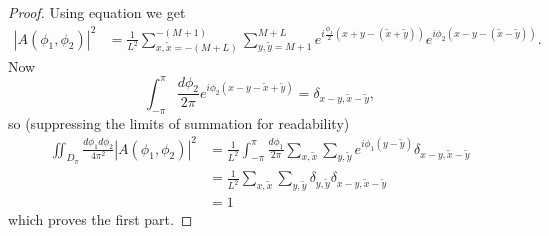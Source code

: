\documentclass[../thesis-main/thesis-main]{subfiles}
\begin{document}
\begin{proof}
Using equation  we get
\begin{align*}
|A(\phi_{1},\phi_{2})|^{2} & =  \frac{1}{L^{2}} \sum_{x,\tilde{x}=-(M+L)}
  ^{-(M+1)} \sum_{y,\tilde{y}=M+1}^{M+L}
	e^{i\frac{\phi_{1}}{2}\left(x+y-(\tilde{x}+\tilde{y})\right)}
        e^{i\phi_{2}\left(x-y-(\tilde{x}-\tilde{y})\right)}.
\end{align*}
Now 
\[
\int_{-\pi}^{\pi}\frac{d\phi_{2}}{2\pi}e^{i\phi_{2}
  \left(x-y-\tilde{x}+\tilde{y}\right)}=\delta_{x-y,\tilde{x}-\tilde{y}},
\]
so (suppressing the limits of summation for readability) 
\begin{align*}
\iint_{D_{\pi}}\frac{d\phi_{1}d\phi_{2}}{4\pi^{2}}
   |A(\phi_{1},\phi_{2})|^{2} 
   & =  \frac{1}{L^{2}} \int_{-\pi}^{\pi}\frac{d\phi_{1}}{2\pi}
     \sum_{x,\tilde{x}}\sum_{y,\tilde{y}}	e^{i\phi_{1}\left(y-\tilde{y}\right)}
     \delta_{x-y,\tilde{x}-\tilde{y}} \\
 & =  \frac{1}{L^{2}}\sum_{x,\tilde{x}}\sum_{y,\tilde{y}}\delta_{y,\tilde{y}}
 	\delta_{x-y,\tilde{x}-\tilde{y}}\\
 & =  1
\end{align*}
which proves the first part.


\end{proof}
\end{document}
